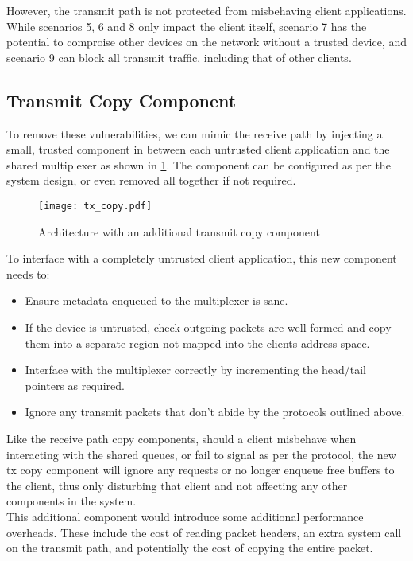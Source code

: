 However, the transmit path is not protected from misbehaving client applications. While scenarios 5, 6 and 8 only impact the client
itself, scenario 7 has the potential to comproise other devices on the network without a trusted device, and scenario 9 can block
all transmit traffic, including that of other clients.\\

\subsection{Transmit Copy Component}

To remove these vulnerabilities, we can mimic the receive path by injecting a small, trusted component in between each untrusted
client application and the shared multiplexer as shown in \ref{f:tx_copy}. The component can be configured as per the system design,
or even removed all together if not required.

\begin{figure}[h]
    \centering
    \texttt{[image: tx\_copy.pdf]}
    \caption{Architecture with an additional transmit copy component}
    \label{f:tx_copy}
\end{figure}

To interface with a completely untrusted client application, this new component needs to:
\begin{itemize}
    \item Ensure metadata enqueued to the multiplexer is sane.
    \item If the device is untrusted, check outgoing packets are well-formed and copy them into a separate region not mapped
          into the clients address space.
    \item Interface with the multiplexer correctly by incrementing the head/tail pointers as required.
    \item Ignore any transmit packets that don't abide by the protocols outlined above.
\end{itemize}

Like the receive path copy components, should a client misbehave when interacting with the shared queues, or fail to signal as per
the protocol, the new tx copy component will ignore any requests or no longer enqueue free buffers to the client, thus only disturbing
that client and not affecting any other components in the system.\\
This additional component would introduce some additional performance overheads. These include the cost of reading packet headers, 
an extra system call on the transmit path, and potentially the cost of copying the entire packet.\\
